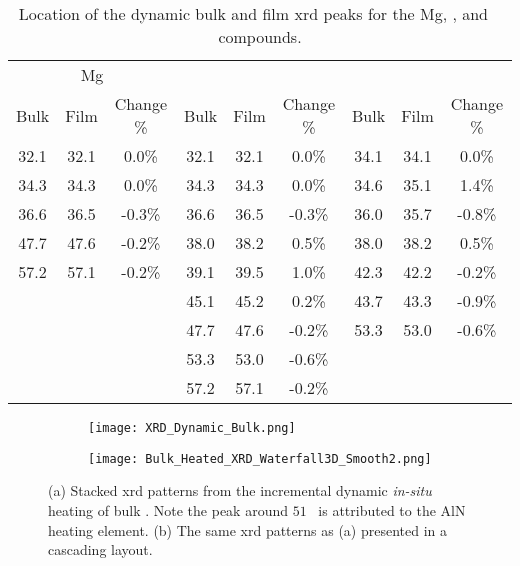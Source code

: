 \documentclass[a4paper,12pt,oneside]{article}%
\begin{document}
\begin{table}[h]
	\centering
	\caption{Location of the dynamic bulk and film \acrshort{xrd} peaks for the Mg, \MgZn, and \CaMgZnFive~ compounds.}
	\begin{tabular}{ c c c c c c c c c }
		\toprule
		\multicolumn{3}{c}{Mg} & \multicolumn{3}{c}{\MgZn} & \multicolumn{3}{c}{\CaMgZnFive} \\
		Bulk & Film & Change \% & Bulk & Film & Change \% & Bulk & Film & Change \% \\
		\midrule
		32.1 & 32.1 & 0.0\%  & 32.1 & 32.1   & 0.0\%  & 34.1 & 34.1 & 0.0\% \\
		34.3 & 34.3 & 0.0\%  & 34.3 & 34.3   & 0.0\%  & 34.6 & 35.1 & 1.4\% \\
		36.6 & 36.5 & -0.3\% & 36.6 & 36.5   & -0.3\% & 36.0 & 35.7 & -0.8\% \\
		47.7 & 47.6 & -0.2\% & 38.0 & 38.2   & 0.5\%  & 38.0 & 38.2 & 0.5\% \\
		57.2 & 57.1 & -0.2\% & 39.1 & 39.5   & 1.0\%  & 42.3 & 42.2 & -0.2\% \\
		&    &      & 45.1   & 45.2 & 0.2\%  & 43.7   & 43.3 & -0.9\% \\
		&    &      & 47.7   & 47.6 & -0.2\% & 53.3   & 53.0 & -0.6\% \\
		&    &      & 53.3   & 53.0 & -0.6\% &        &      &        \\
		&    &      & 57.2   & 57.1 & -0.2\% &        &      &        \\
		\bottomrule
	\end{tabular}
	\label{tab:Dynamic_XRD_PeakShift}
\end{table}

\begin{figure}[b]
	\centering
	\begin{subfigure}[htbp]{0.75\textwidth}
		\texttt{[image: XRD\_Dynamic\_Bulk.png]}
		\caption{}
		\label{fig:XRD_Dynamic_FullStack_Bulk}
	\end{subfigure}
	\begin{subfigure}[htbp]{0.75\textwidth}
		\texttt{[image: Bulk\_Heated\_XRD\_Waterfall3D\_Smooth2.png]}
		\caption{}
		\label{fig:XRD_Dynamic_WaterFall_Bulk}
	\end{subfigure}
	\caption{(a) Stacked \acrshort{xrd} patterns from the incremental dynamic \textit{in-situ} heating of bulk \MgZnCa. Note the peak around $51$\degree~ is attributed to the AlN heating element. (b) The same \acrshort{xrd} patterns as (a) presented in a cascading layout.}%
	\label{fig:XRD_Dynamic_Bulk}
\end{figure}
\end{document}
